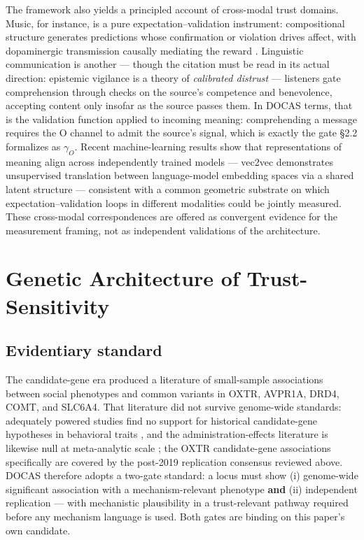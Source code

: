\documentclass[11pt,twocolumn]{article}
\theoremstyle{plain}
\begin{document}
The framework also yields a principled account of cross-modal trust domains. Music, for instance, is a pure expectation–validation instrument: compositional structure generates predictions whose confirmation or violation drives affect, with dopaminergic transmission causally mediating the reward \citep{ferreri2019,blood2001}. Linguistic communication is another — though the citation must be read in its actual direction: epistemic vigilance \citep{sperber2010} is a theory of \textit{calibrated distrust} — listeners gate comprehension through checks on the source's competence and benevolence, accepting content only insofar as the source passes them. In DOCAS terms, that is the validation function applied to incoming meaning: comprehending a message requires the O channel to admit the source's signal, which is exactly the gate \S{}2.2 formalizes as $\gamma_O$. Recent machine-learning results show that representations of meaning align across independently trained models — vec2vec demonstrates unsupervised translation between language-model embedding spaces via a shared latent structure \citep{jha2025} — consistent with a common geometric substrate on which expectation–validation loops in different modalities could be jointly measured. These cross-modal correspondences are offered as convergent evidence for the measurement framing, not as independent validations of the architecture.


\FloatBarrier
\section{Genetic Architecture of Trust-Sensitivity}

\subsection{Evidentiary standard}

The candidate-gene era produced a literature of small-sample associations between social phenotypes and common variants in OXTR, AVPR1A, DRD4, COMT, and SLC6A4. That literature did not survive genome-wide standards: adequately powered studies find no support for historical candidate-gene hypotheses in behavioral traits \citep[major depression; the trust-relevant candidate literature shares the same methodology and era]{border2019}, and the administration-effects literature is likewise null at meta-analytic scale \citep{nave2015,declerck2020}; the OXTR candidate-gene associations specifically are covered by the post-2019 replication consensus reviewed above. DOCAS therefore adopts a two-gate standard: a locus must show (i) genome-wide significant association with a mechanism-relevant phenotype \textbf{and} (ii) independent replication — with mechanistic plausibility in a trust-relevant pathway required before any mechanism language is used. Both gates are binding on this paper's own candidate.
\end{document}
